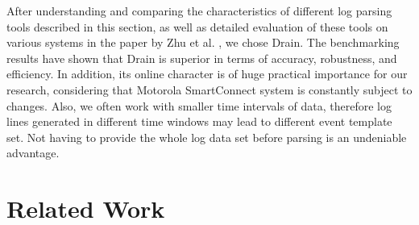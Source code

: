     After understanding and comparing the characteristics of different log parsing tools described in this section, as well as detailed evaluation of these tools on various systems in the paper by Zhu et al. \cite{zhlhxzl2018}, we chose Drain. The benchmarking results have shown that Drain is superior in terms of accuracy, robustness, and efficiency. In addition, its online character is of huge practical importance for our research, considering that Motorola SmartConnect system is constantly subject to changes. Also, we often work with smaller time intervals of data, therefore log lines generated in different time windows may lead to different event template set. Not having to provide the whole log data set before parsing is an undeniable advantage.

\section{Related Work}